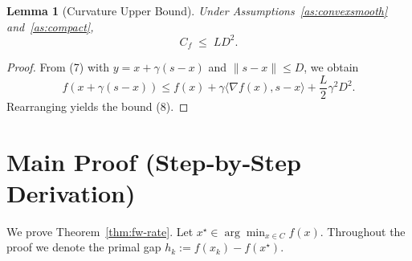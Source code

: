 \documentclass{article}
\newtheorem{lemma}{Lemma}
\begin{document}
\begin{lemma}[Curvature Upper Bound]\label{lem:curvbound}
Under Assumptions~\ref{as:convexsmooth} and~\ref{as:compact},
\[
C_{f}\;\le\;L D^{2}.
\tag{8}
\]
\end{lemma}
\begin{proof}
From (7) with $y=x+\gamma(s-x)$ and $\|s-x\|\le D$, we obtain
\[
f(x+\gamma(s-x))\le f(x)+\gamma\langle\nabla f(x),s-x\rangle+\frac{L}{2}\gamma^{2}D^{2}.
\]
Rearranging yields the bound (8). \qedhere
\end{proof}

\section*{Main Proof (Step‑by‑Step Derivation)}
We prove Theorem~\ref{thm:fw-rate}. Let $x^{\star}\in\arg\min_{x\in C}f(x)$. Throughout the proof we denote the primal gap $h_{k}:=f(x_{k})-f(x^{\star})$.
\end{document}
